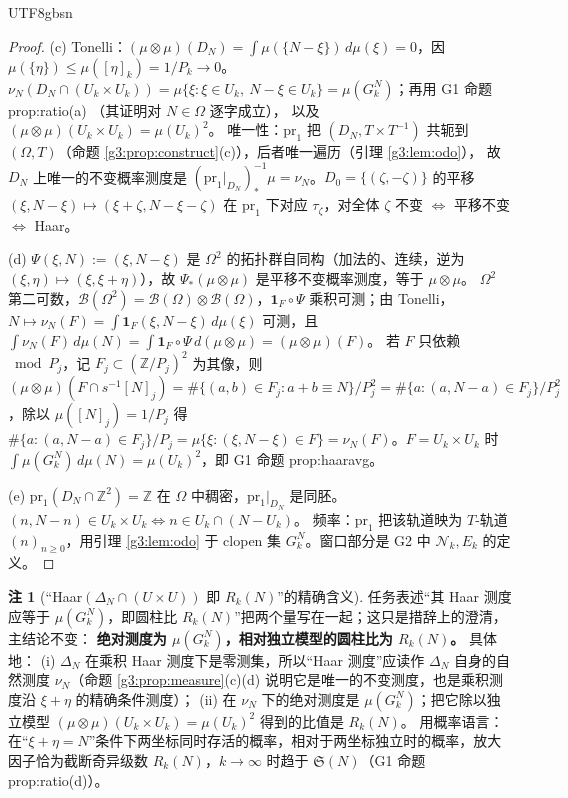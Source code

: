 \documentclass[11pt,a4paper]{article}
\newcommand{\Haar}{\mu}
\newcommand{\Sing}{\mathfrak S}
\newcommand{\Cnt}{\mathcal N}          %
\newcommand{\Om}{\Omega}               %
\newcommand{\cyl}[2]{[#1]_{#2}}        %
\newcommand{\pr}{\mathrm{pr}}
\theoremstyle{plain}
\theoremstyle{definition}
\newtheorem{rem}[lem]{注}
\begin{document}
\begin{CJK}{UTF8}{gbsn}
\begin{proof}
(c) Tonelli：$(\Haar\otimes\Haar)(D_N)=\int\Haar(\{N-\xi\})\,d\Haar(\xi)=0$，因 $\Haar(\{\eta\})\le\Haar(\cyl{\eta}k)=1/P_k\to0$。
$\nu_N(D_N\cap(U_k\times U_k))=\Haar\{\xi:\xi\in U_k,\ N-\xi\in U_k\}=\Haar(G_k^N)$；再用 G1 命题 prop:ratio(a) \cite{G1}（其证明对 $N\in\Om$ 逐字成立），
以及 $(\Haar\otimes\Haar)(U_k\times U_k)=\Haar(U_k)^2$。
唯一性：$\pr_1$ 把 $(D_N,T\times T^{-1})$ 共轭到 $(\Om,T)$（命题 \ref{g3:prop:construct}(c)），后者唯一遍历（引理 \ref{g3:lem:odo}），
故 $D_N$ 上唯一的不变概率测度是 $(\pr_1|_{D_N})^{-1}_*\Haar=\nu_N$。$D_0=\{(\zeta,-\zeta)\}$ 的平移 $(\xi,N-\xi)\mapsto(\xi+\zeta,N-\xi-\zeta)$
在 $\pr_1$ 下对应 $\tau_\zeta$，对全体 $\zeta$ 不变 $\iff$ 平移不变 $\iff$ Haar。

(d) $\Psi(\xi,N):=(\xi,N-\xi)$ 是 $\Om^2$ 的拓扑群自同构（加法的、连续，逆为 $(\xi,\eta)\mapsto(\xi,\xi+\eta)$），故 $\Psi_*(\Haar\otimes\Haar)$ 是平移不变概率测度，等于 $\Haar\otimes\Haar$。
$\Om^2$ 第二可数，$\mathcal B(\Om^2)=\mathcal B(\Om)\otimes\mathcal B(\Om)$，$\mathbf 1_F\circ\Psi$ 乘积可测；由 Tonelli，$N\mapsto\nu_N(F)=\int\mathbf 1_F(\xi,N-\xi)\,d\Haar(\xi)$ 可测，且
$\int\nu_N(F)\,d\Haar(N)=\int\mathbf 1_F\circ\Psi\,d(\Haar\otimes\Haar)=(\Haar\otimes\Haar)(F)$。
若 $F$ 只依赖 $\bmod P_j$，记 $F_j\subset(\mathbb Z/P_j)^2$ 为其像，则
$(\Haar\otimes\Haar)(F\cap s^{-1}\cyl Nj)=\#\{(a,b)\in F_j:a+b\equiv N\}/P_j^2=\#\{a:(a,N-a)\in F_j\}/P_j^2$，除以 $\Haar(\cyl Nj)=1/P_j$
得 $\#\{a:(a,N-a)\in F_j\}/P_j=\Haar\{\xi:(\xi,N-\xi)\in F\}=\nu_N(F)$。$F=U_k\times U_k$ 时 $\int\Haar(G_k^N)\,d\Haar(N)=\Haar(U_k)^2$，即 G1 命题 prop:haaravg。

(e) $\pr_1(D_N\cap\mathbb Z^2)=\mathbb Z$ 在 $\Om$ 中稠密，$\pr_1|_{D_N}$ 是同胚。$(n,N-n)\in U_k\times U_k\iff n\in U_k\cap(N-U_k)$。
频率：$\pr_1$ 把该轨道映为 $T$-轨道 $(n)_{n\ge0}$，用引理 \ref{g3:lem:odo} 于 clopen 集 $G_k^N$。窗口部分是 G2 中 $\Cnt_k,E_k$ 的定义。
\end{proof}

\begin{rem}[“Haar$(\Delta_N\cap(U\times U))$ 即 $R_k(N)$”的精确含义]\label{g3:rem:ratio}
任务表述“其 Haar 测度应等于 $\Haar(G_k^N)$，即圆柱比 $R_k(N)$”把两个量写在一起；这只是措辞上的澄清，主结论不变：
\textbf{绝对测度为 $\Haar(G_k^N)$，相对独立模型的圆柱比为 $R_k(N)$。} 具体地：
(i) $\Delta_N$ 在乘积 Haar 测度下是零测集，所以“Haar 测度”应读作 $\Delta_N$ 自身的自然测度 $\nu_N$（命题 \ref{g3:prop:measure}(c)(d) 说明它是唯一的不变测度，也是乘积测度沿 $\xi+\eta$ 的精确条件测度）；
(ii) 在 $\nu_N$ 下的绝对测度是 $\Haar(G_k^N)$；把它除以独立模型 $(\Haar\otimes\Haar)(U_k\times U_k)=\Haar(U_k)^2$ 得到的比值是 $R_k(N)$。
用概率语言：在“$\xi+\eta=N$”条件下两坐标同时存活的概率，相对于两坐标独立时的概率，放大因子恰为截断奇异级数 $R_k(N)$，$k\to\infty$ 时趋于 $\Sing(N)$（G1 命题 prop:ratio(d)）。
\end{rem}


\end{CJK}
\end{document}
